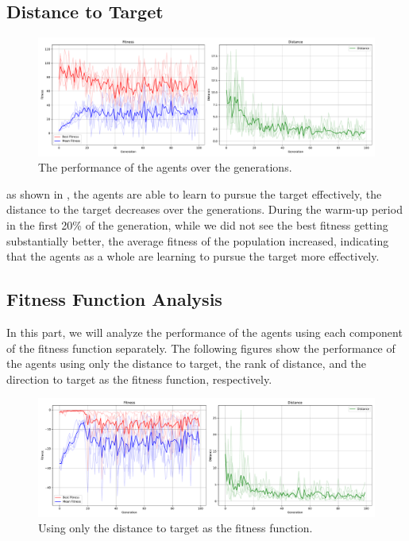 \documentclass[sigconf]{acmart}
\begin{document}
\subsection{Distance to Target}
\begin{figure}[H]
  \centering
  \includegraphics[width=0.95\linewidth]{imgs/result_Run_cx0.85_mut0.25_2024_1214_0619.pdf}
  \caption{The performance of the agents over the generations.}
  \label{fig:plot_all}
\end{figure}
as shown in , the agents are able to learn to pursue the target effectively, the distance to the target decreases over the generations. During the warm-up period in the first 20\% of the generation, while we did not see the best fitness getting substantially better, the average fitness of the population increased, indicating that the agents as a whole are learning to pursue the target more effectively. 

\subsection{Fitness Function Analysis}
In this part, we will analyze the performance of the agents using each component of the fitness function separately. The following figures show the performance of the agents using only the distance to target, the rank of distance, and the direction to target as the fitness function, respectively.
\begin{figure}[H]
  \centering
  \includegraphics[width=0.95\linewidth]{imgs/result_Run_cx0.85_mut0.25_2024_1214_0633_dist_only.pdf}
  \caption{Using only the distance to target as the fitness function.}
  \label{fig:plot_dist}
\end{figure}
\end{document}

